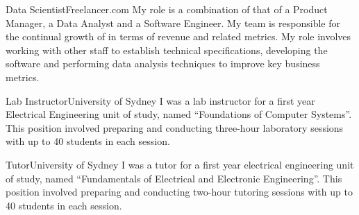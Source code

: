 \begin{professionalExperience}

{Data Scientist}{Freelancer.com}
{My role is a combination of that of a Product Manager, a Data Analyst and a
Software Engineer. My team is responsible for the continual growth of
 in terms of revenue and related metrics. My role
involves working with other staff to establish technical specifications,
developing the software and performing data analysis techniques to improve key
business metrics.}

{Lab Instructor}{University of Sydney}
{I was a lab instructor for a first year Electrical Engineering unit of study,
named ``Foundations of Computer Systems''. This position involved preparing
and conducting three-hour laboratory sessions with up to 40 students in each
session.}

{Tutor}{University of Sydney}
{I was a tutor for a first year electrical engineering unit of study, named
``Fundamentals of Electrical and Electronic Engineering''. This position
involved preparing and conducting two-hour tutoring sessions with up to 40
students in each session.}

\end{professionalExperience}
